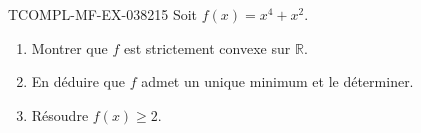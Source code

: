 \begin{exercice}{TCOMPL-MF-EX-038}{2}{15}
Soit $f(x) = x^4 + x^2$.
\begin{enumerate}
  \item Montrer que $f$ est strictement convexe sur $\mathbb{R}$.
  \item En déduire que $f$ admet un unique minimum et le déterminer.
  \item Résoudre $f(x) \geq 2$.
\end{enumerate}

\end{exercice}

